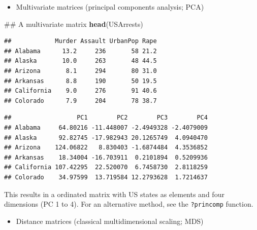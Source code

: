 \documentclass[]{book}
\newenvironment{Shaded}{\begin{snugshade}}{\end{snugshade}}
\newcommand{\KeywordTok}[1]{\textcolor[rgb]{0.13,0.29,0.53}{\textbf{#1}}}
\newcommand{\StringTok}[1]{\textcolor[rgb]{0.31,0.60,0.02}{#1}}
\newcommand{\OperatorTok}[1]{\textcolor[rgb]{0.81,0.36,0.00}{\textbf{#1}}}
\newcommand{\NormalTok}[1]{#1}
\providecommand{\tightlist}{%
  \setlength{\itemsep}{0pt}\setlength{\parskip}{0pt}}
\theoremstyle{definition}
\theoremstyle{definition}
\theoremstyle{remark}
\begin{document}
\begin{itemize}
\tightlist
\item
  Multivariate matrices (principal components analysis; PCA)
\end{itemize}

\begin{Shaded}
\begin{Highlighting}[]
\NormalTok{## A multivariate matrix}
\KeywordTok{head}\NormalTok{(USArrests)}
\end{Highlighting}
\end{Shaded}

\begin{verbatim}
##            Murder Assault UrbanPop Rape
## Alabama      13.2     236       58 21.2
## Alaska       10.0     263       48 44.5
## Arizona       8.1     294       80 31.0
## Arkansas      8.8     190       50 19.5
## California    9.0     276       91 40.6
## Colorado      7.9     204       78 38.7
\end{verbatim}

\begin{Shaded}
\end{Shaded}

\begin{verbatim}
##                  PC1        PC2        PC3        PC4
## Alabama     64.80216 -11.448007 -2.4949328 -2.4079009
## Alaska      92.82745 -17.982943 20.1265749  4.0940470
## Arizona    124.06822   8.830403 -1.6874484  4.3536852
## Arkansas    18.34004 -16.703911  0.2101894  0.5209936
## California 107.42295  22.520070  6.7458730  2.8118259
## Colorado    34.97599  13.719584 12.2793628  1.7214637
\end{verbatim}

This results in a ordinated matrix with US states as elements and four
dimensions (PC 1 to 4). For an alternative method, see the
\texttt{?princomp} function.

\begin{itemize}
\tightlist
\item
  Distance matrices (classical multidimensional scaling; MDS)
\end{itemize}
\end{document}
